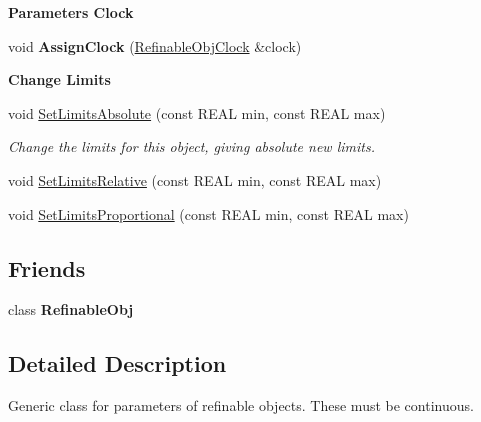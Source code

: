 \begin{Indent}\textbf{ Parameter\textquotesingle{}s Clock}\par
\begin{DoxyCompactItemize}
\item 
\mbox{\label{class_obj_cryst_1_1_refinable_par_ab03f6bffb78dd812136a73b94b64ee6e}} 
void {\bfseries Assign\+Clock} (\mbox{\hyperlink{class_obj_cryst_1_1_refinable_obj_clock}{Refinable\+Obj\+Clock}} \&clock)
\end{DoxyCompactItemize}
\end{Indent}
\begin{Indent}\textbf{ Change Limits}\par
\begin{DoxyCompactItemize}
\item 
\mbox{\label{class_obj_cryst_1_1_refinable_par_aad4275aa946de7b60aaf3353971663dd}} 
void \mbox{\hyperlink{class_obj_cryst_1_1_refinable_par_aad4275aa946de7b60aaf3353971663dd}{Set\+Limits\+Absolute}} (const R\+E\+AL min, const R\+E\+AL max)
\begin{DoxyCompactList}\small\item\em Change the limits for this object, giving absolute new limits. \end{DoxyCompactList}\item 
void \mbox{\hyperlink{class_obj_cryst_1_1_refinable_par_ad445354c927f8df95443a55174e7bb7d}{Set\+Limits\+Relative}} (const R\+E\+AL min, const R\+E\+AL max)
\item 
void \mbox{\hyperlink{class_obj_cryst_1_1_refinable_par_afb15606bb24a5fbb144d07843bb11f97}{Set\+Limits\+Proportional}} (const R\+E\+AL min, const R\+E\+AL max)
\end{DoxyCompactItemize}
\end{Indent}
\subsection*{Friends}
\begin{DoxyCompactItemize}
\item 
\mbox{\label{class_obj_cryst_1_1_refinable_par_a4b004207cfa15cef5b32be20104e3eaf}} 
class {\bfseries Refinable\+Obj}
\end{DoxyCompactItemize}


\subsection{Detailed Description}
Generic class for parameters of refinable objects. These must be continuous.

